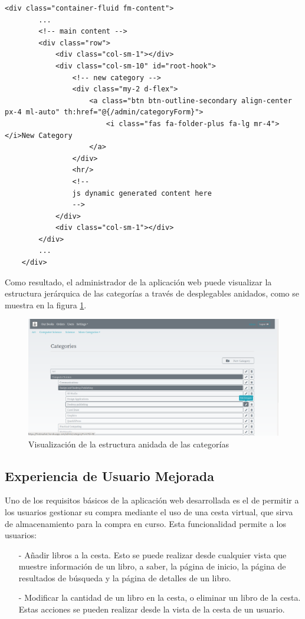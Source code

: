 \documentclass[a4paper]{article}
\begin{document}
    \begin{lstlisting}[caption=Contenido principal de la vista categories.html,label=list:html_categories]
    <div class="container-fluid fm-content">
	    ...
	    <!-- main content -->
	    <div class="row">
		    <div class="col-sm-1"></div>
		    <div class="col-sm-10" id="root-hook">
			    <!-- new category -->
			    <div class="my-2 d-flex">
				    <a class="btn btn-outline-secondary align-center px-4 ml-auto" th:href="@{/admin/categoryForm}">
				    	<i class="fas fa-folder-plus fa-lg mr-4"></i>New Category
				    </a>
			    </div>
			    <hr/>
			    <!--
			    js dynamic generated content here
			    -->
		    </div>
		    <div class="col-sm-1"></div>
	    </div>
	    ...
    </div>
    \end{lstlisting}
    
    Como resultado, el administrador de la aplicación web puede visualizar la estructura jerárquica de las categorías a través de desplegables anidados, como se muestra en la figura \ref{fig:nested_categories}.
    
    \begin{figure}[htb!]
    	\centering
    	\includegraphics[width=\textwidth]{nested_categories}
    	\caption{Visualización de la estructura anidada de las categorías}
    	\label{fig:nested_categories}
    \end{figure}
    
    \subsection{Experiencia de Usuario Mejorada}
    Uno de los requisitos básicos de la aplicación web desarrollada es el de permitir a los usuarios gestionar su compra mediante el uso de una cesta virtual, que sirva de almacenamiento para la compra en curso. Esta funcionalidad permite a los usuarios:
    
    \begin{itemize}
    	\item[-] Añadir libros a la cesta. Esto se puede realizar desde cualquier vista que muestre información de un libro, a saber, la página de inicio, la página de resultados de búsqueda y la página de detalles de un libro.
    	\item[-] Modificar la cantidad de un libro en la cesta, o eliminar un libro de la cesta. Estas acciones se pueden realizar desde la vista de la cesta de un usuario.
    \end{itemize}
    
\end{document}
